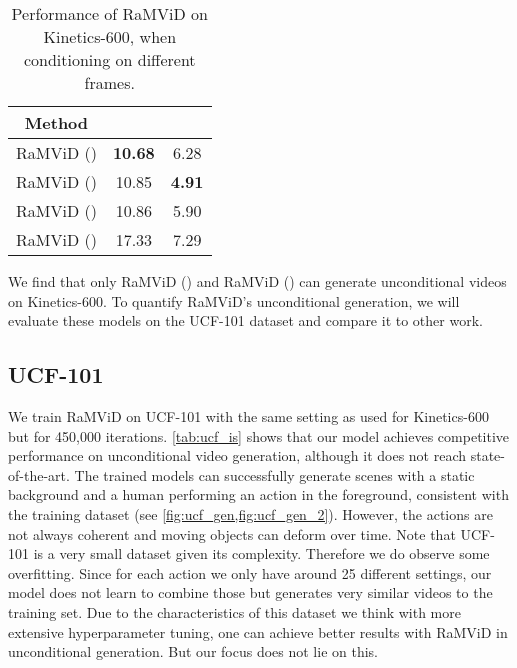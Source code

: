 \documentclass[10pt]{article} \usepackage[accepted]{tmlr}
\begin{document}
\begin{table}
    \centering
    \caption{Performance of RaMViD on Kinetics-600, when conditioning on different frames.}
    \begin{tabular}{ccc}
        \toprule
        \textbf{Method} &  \textbf{} &  \textbf{}\\
        \midrule
        RaMViD () & \textbf{10.68} & 6.28 \\ 
        RaMViD () & 10.85 & \textbf{4.91}  \\ 
        RaMViD () & 10.86 & 5.90  \\ 
        RaMViD () & 17.33 & 7.29 \\ 
        \bottomrule
    \end{tabular}
    \label{tab:kinetics_completion}
\end{table}

We find that only RaMViD () and RaMViD () can generate unconditional videos on Kinetics-600. To quantify RaMViD's unconditional generation, we will evaluate these models on the UCF-101 dataset and compare it to other work. 


\subsection{UCF-101}
We train RaMViD on UCF-101 with the same setting as used for Kinetics-600 but for 450,000 iterations. \cref{tab:ucf_is} shows that our model achieves competitive performance on unconditional video generation, although it does not reach state-of-the-art. The trained models can successfully generate scenes with a static background and a human performing an action in the foreground, consistent with the training dataset (see \cref{fig:ucf_gen,fig:ucf_gen_2}). However, the actions are not always coherent and moving objects can deform over time. Note that UCF-101 is a very small dataset given its complexity. Therefore we do observe some overfitting. Since for each action we only have around 25 different settings, our model does not learn to combine those but generates very similar videos to the training set. Due to the characteristics of this dataset we think with more extensive hyperparameter tuning, one can achieve better results with RaMViD in unconditional generation. But our focus does not lie on this. 
\end{document}

